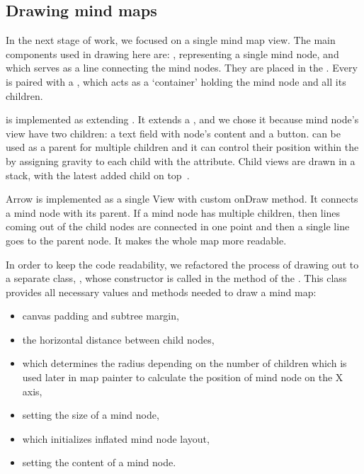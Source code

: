 \subsection{Drawing mind maps}
\label{subsec:drawing-m}
In the next stage of work, we focused on a single mind map view. The main components used in drawing here are: , representing a single mind node, and  which serves as a line connecting the mind nodes. They are placed in the . Every  is paired with a , which acts as a `container' holding the mind node and all its children.

 is implemented as extending . It extends a , and we chose it because mind node's view have two children: a text field with node's content and a button.  can be used as a parent for multiple children and it can control their position within the  by assigning gravity to each child with the  attribute. Child views are drawn in a stack, with the latest added child on top~\cite{API:2013:fl}.

Arrow is implemented as a single View with custom onDraw method. It connects a mind node with its parent. If a mind node has multiple children, then lines coming out of the child nodes are connected in one point and then a single line goes to the parent node. It makes the whole map more readable.

In order to keep the code readability, we refactored the process of drawing out to a separate class, , whose constructor is called in the  method of the . This class provides all necessary values and methods needed to draw a mind map:

\begin{itemize}
	\item canvas padding and subtree margin,
	\item the horizontal distance between child nodes,
	\item {} which determines the radius depending on the number of children which is used later in map painter to calculate the position of mind node on the X axis,
	\item {} setting the size of a mind node,
	\item {} which initializes inflated mind node layout,
	\item {} setting the content of a mind node.
\end{itemize}


